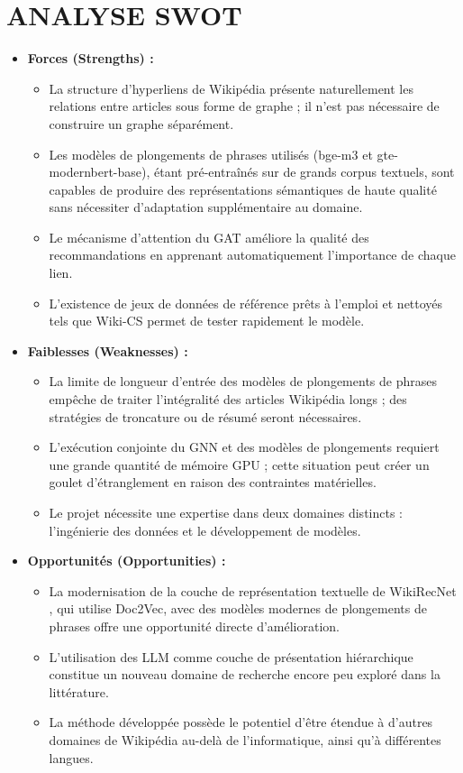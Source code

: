 \chapter{ANALYSE SWOT}
\thispagestyle{empty}

\begin{itemize}
    \item \textbf{Forces (Strengths) :}
    \begin{itemize}
        \item La structure d'hyperliens de Wikipédia présente naturellement les relations entre articles sous forme de graphe ; il n'est pas nécessaire de construire un graphe séparément.
        \item Les modèles de plongements de phrases utilisés (bge-m3 et gte-modernbert-base), étant pré-entraînés sur de grands corpus textuels, sont capables de produire des représentations sémantiques de haute qualité sans nécessiter d'adaptation supplémentaire au domaine.
        \item Le mécanisme d'attention du GAT améliore la qualité des recommandations en apprenant automatiquement l'importance de chaque lien.
        \item L'existence de jeux de données de référence prêts à l'emploi et nettoyés tels que Wiki-CS \cite{mernyei2020wikics} permet de tester rapidement le modèle.
    \end{itemize}

    \item \textbf{Faiblesses (Weaknesses) :}
    \begin{itemize}
        \item La limite de longueur d'entrée des modèles de plongements de phrases empêche de traiter l'intégralité des articles Wikipédia longs ; des stratégies de troncature ou de résumé seront nécessaires.
        \item L'exécution conjointe du GNN et des modèles de plongements requiert une grande quantité de mémoire GPU ; cette situation peut créer un goulet d'étranglement en raison des contraintes matérielles.
        \item Le projet nécessite une expertise dans deux domaines distincts : l'ingénierie des données et le développement de modèles.
    \end{itemize}

    \item \textbf{Opportunités (Opportunities) :}
    \begin{itemize}
        \item La modernisation de la couche de représentation textuelle de WikiRecNet \cite{wikirecnet2020}, qui utilise Doc2Vec, avec des modèles modernes de plongements de phrases offre une opportunité directe d'amélioration.
        \item L'utilisation des LLM comme couche de présentation hiérarchique constitue un nouveau domaine de recherche encore peu exploré dans la littérature.
        \item La méthode développée possède le potentiel d'être étendue à d'autres domaines de Wikipédia au-delà de l'informatique, ainsi qu'à différentes langues.
    \end{itemize}


\end{itemize}
